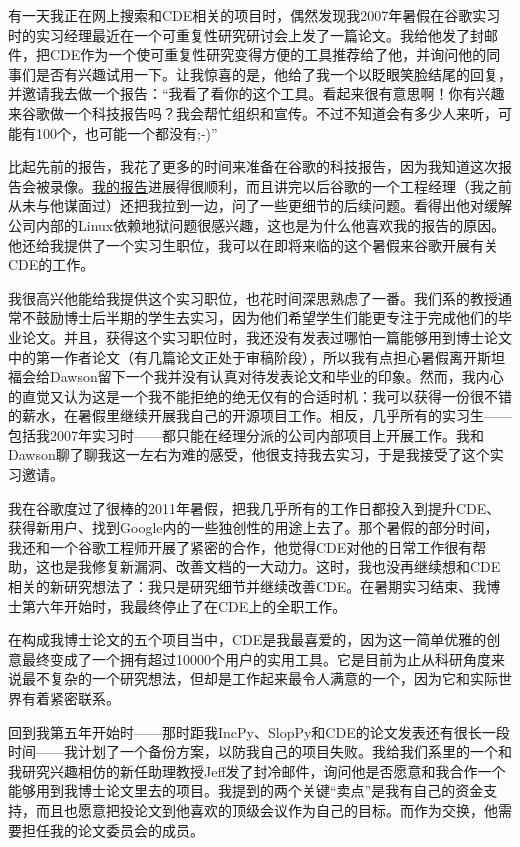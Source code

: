 \documentclass[letter,12pt]{book}
\begin{document}
\begin{CJK}{UTF8}{gbsn}
有一天我正在网上搜索和CDE相关的项目时，偶然发现我2007年暑假在谷歌实习时的实习经理最近在一个可重复性研究研讨会上发了一篇论文。我给他发了封邮件，把CDE作为一个使可重复性研究变得方便的工具推荐给了他，并询问他的同事们是否有兴趣试用一下。让我惊喜的是，他给了我一个以眨眼笑脸结尾的回复，并邀请我去做一个报告：“我看了看你的这个工具。看起来很有意思啊！你有兴趣来谷歌做一个科技报告吗？我会帮忙组织和宣传。不过不知道会有多少人来听，可能有100个，也可能一个都没有;-)”

比起先前的报告，我花了更多的时间来准备在谷歌的科技报告，因为我知道这次报告会被录像。\href{https://www.youtube.com/watch?feature=player_embedded&v=6XdwHo1BWwY}{我的报告}进展得很顺利，而且讲完以后谷歌的一个工程经理（我之前从未与他谋面过）还把我拉到一边，问了一些更细节的后续问题。看得出他对缓解公司内部的Linux依赖地狱问题很感兴趣，这也是为什么他喜欢我的报告的原因。他还给我提供了一个实习生职位，我可以在即将来临的这个暑假来谷歌开展有关CDE的工作。

我很高兴他能给我提供这个实习职位，也花时间深思熟虑了一番。我们系的教授通常不鼓励博士后半期的学生去实习，因为他们希望学生们能更专注于完成他们的毕业论文。并且，获得这个实习职位时，我还没有发表过哪怕一篇能够用到博士论文中的第一作者论文（有几篇论文正处于审稿阶段），所以我有点担心暑假离开斯坦福会给Dawson留下一个我并没有认真对待发表论文和毕业的印象。然而，我内心的直觉又认为这是一个我不能拒绝的绝无仅有的合适时机：我可以获得一份很不错的薪水，在暑假里继续开展我自己的开源项目工作。相反，几乎所有的实习生——包括我2007年实习时——都只能在经理分派的公司内部项目上开展工作。我和Dawson聊了聊我这一左右为难的感受，他很支持我去实习，于是我接受了这个实习邀请。

我在谷歌度过了很棒的2011年暑假，把我几乎所有的工作日都投入到提升CDE、获得新用户、找到Google内的一些独创性的用途上去了。那个暑假的部分时间，我还和一个谷歌工程师开展了紧密的合作，他觉得CDE对他的日常工作很有帮助，这也是我修复新漏洞、改善文档的一大动力。这时，我也没再继续想和CDE相关的新研究想法了：我只是研究细节并继续改善CDE。在暑期实习结束、我博士第六年开始时，我最终停止了在CDE上的全职工作。

在构成我博士论文的五个项目当中，CDE是我最喜爱的，因为这一简单优雅的创意最终变成了一个拥有超过10000个用户的实用工具。它是目前为止从科研角度来说最不复杂的一个研究想法，但却是工作起来最令人满意的一个，因为它和实际世界有着紧密联系。

\breakline

回到我第五年开始时——那时距我IncPy、SlopPy和CDE的论文发表还有很长一段时间——我计划了一个备份方案，以防我自己的项目失败。我给我们系里的一个和我研究兴趣相仿的新任助理教授Jeff发了封冷邮件，询问他是否愿意和我合作一个能够用到我博士论文里去的项目。我提到的两个关键“卖点”是我有自己的资金支持，而且也愿意把投论文到他喜欢的顶级会议作为自己的目标。而作为交换，他需要担任我的论文委员会的成员。


\end{CJK}
\end{document}
